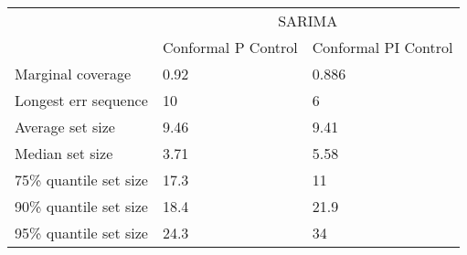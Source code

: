 \begin{tabular}{lll}
\toprule
& \multicolumn{2}{c}{SARIMA} \\
& Conformal P Control & Conformal PI Control \\
\midrule
Marginal coverage & 0.92 & 0.886 \\
Longest err sequence & 10 & 6 \\
Average set size & 9.46 & 9.41 \\
Median set size & 3.71 & 5.58 \\
75\% quantile set size & 17.3 & 11 \\
90\% quantile set size & 18.4 & 21.9 \\
95\% quantile set size & 24.3 & 34 \\
\bottomrule
\end{tabular}
